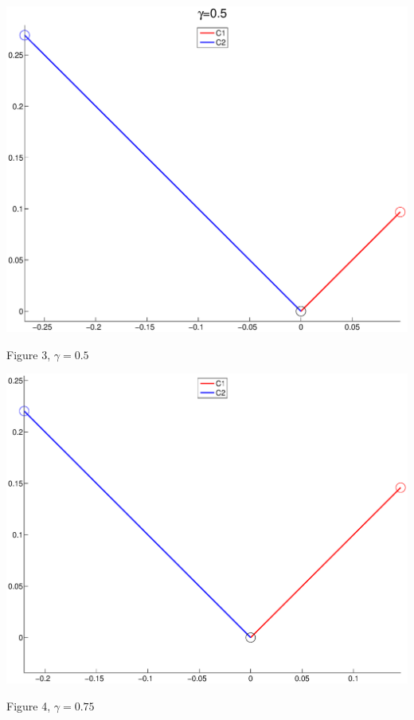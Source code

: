 \documentclass{article}
\begin{document}
\begin{center}
\includegraphics[width=\textwidth]{eigen3.eps}
\begin{footnotesize}
 Figure 3, $\gamma=0.5$
\end{footnotesize}
\end{center}

\begin{center}
\includegraphics[width=\textwidth]{eigen4.eps}
\begin{footnotesize}
 Figure 4, $\gamma=0.75$
\end{footnotesize}
\end{center}
\end{document}

